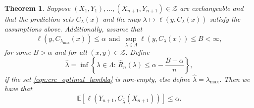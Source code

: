 \documentclass[11pt, titlepage]{article} %
\newcommand{\R}{\mathrm}
\newcommand{\Exp}[3]{\mathbb{E}\left#2 #1 \right#3}
\numberwithin{equation}{section}
\newtheorem{theorem}{Theorem}
\theoremstyle{definition}
\numberwithin{theorem}{section}
\numberwithin{lemma}{section}
\numberwithin{corollary}{section}
\numberwithin{proposition}{section}
\numberwithin{definition}{section}
\numberwithin{remark}{section}
\begin{document}
\begin{theorem}
\label{thm:crc_guarantee}
    Suppose \((X_1, Y_1), \ldots, (X_{n+1}, Y_{n+1}) \in \mathcal{Z}\) are exchangeable and that the prediction sets \(C_\lambda(x)\) and the map \(\lambda \mapsto \ell(y, C_\lambda(x))\) satisfy the assumptions above. Additionally, assume that \[ \ell(y, C_{\lambda_\R{max}}(x)) \leq \alpha \ \ \R{and} \ \ \sup_{\lambda \in \Lambda} \ell(y, C_\lambda (x)) \leq B < \infty,\] for some \(B > \alpha\) and for all \((x, y) \in \mathcal{Z}\). Define \begin{equation}
    \label{eqn:crc_optimal_lambda}
        \hat{\lambda} = \inf \left\{\lambda \in \Lambda : \, \hat{R}_n(\lambda) \leq \alpha - \frac{B - \alpha}{n}\right\},
    \end{equation} if the set \eqref{eqn:crc_optimal_lambda} is non-empty, else define \(\hat{\lambda} = \lambda_\R{max}\). Then we have that \[\Exp{\ell(Y_{n+1}, C_{\hat{\lambda}}(X_{n+1}))}{[}{]} \leq \alpha.\]
\end{theorem}
\end{document}
